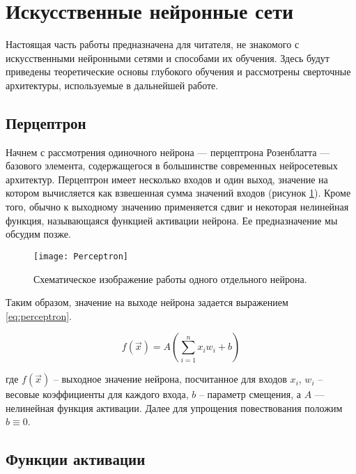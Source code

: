 \section{Искусственные нейронные сети}

\indent
\indent
Настоящая часть работы предназначена для читателя, не знакомого с 
искусственными нейронными сетями и способами их обучения. 
Здесь будут приведены теоретические 
основы глубокого обучения и рассмотрены сверточные архитектуры, 
используемые в дальнейшей работе.


\subsection{Перцептрон}

\indent
Начнем с рассмотрения одиночного нейрона
 --- перцептрона Розенблатта --- базового элемента, содержащегося в большинстве современных нейросетевых архитектур.
Перцептрон имеет несколько входов и один выход, значение на котором
вычисляется как взвешенная сумма значений входов 
(рисунок \ref{tikzpicture: perceptron}).
Кроме того, обычно
к выходному значению применяется сдвиг и некоторая нелинейная функция, 
называющаяся функцией активации нейрона. Ее предназначение мы обсудим позже.

\begin{figure}[h!]
    \begin{center}
   	    \texttt{[image: Perceptron]}
   	\end{center}
   	\caption{Схематическое изображение работы одного отдельного нейрона.}
   	\label{tikzpicture: perceptron}
\end{figure}


\indent
\indent
Таким образом, значение на выходе нейрона задается
 выражением \ref{eq:perceptron}.

\begin{equation}\label{eq:perceptron}
    f(\vec{x}) = A(\sum_{i=1}^n x_i w_i + b)
\end{equation}


где $f(\vec{x})$ -- выходное значение нейрона, посчитанное для входов $x_i$,
$w_i$ -- весовые коэффициенты для каждого входа, $b$ -- параметр смещения, 
а $A$ --- нелинейная функция активации. Далее для упрощения повествования
положим $b \equiv 0$.

\subsection{Функции активации}

